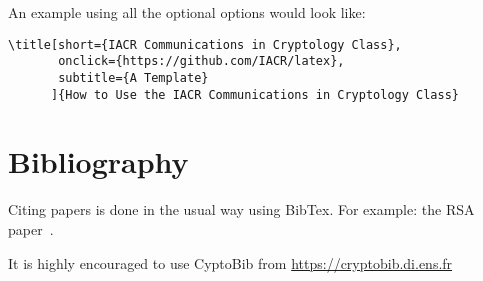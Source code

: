 \documentclass{iacrcc}
\begin{document}
An example using all the optional options would look like:

\begin{verbatim}
\title[short={IACR Communications in Cryptology Class},
       onclick={https://github.com/IACR/latex},
       subtitle={A Template}
      ]{How to Use the IACR Communications in Cryptology Class}
\end{verbatim}

\section{Bibliography}
Citing papers is done in the usual way using BibTex. 
For example: the RSA paper~\cite{RSA78}.

It is highly encouraged to use CyptoBib from \url{https://cryptobib.di.ens.fr}




\end{document}
